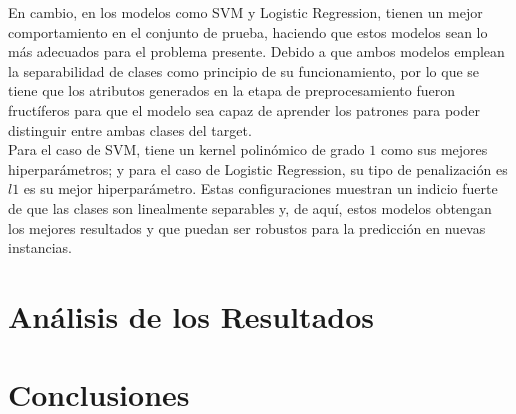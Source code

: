 \documentclass[12pt,a4paper]{article}
\begin{document}
{{            En cambio, en los modelos como SVM y Logistic Regression, tienen un mejor comportamiento 
            en el conjunto de prueba, haciendo que estos modelos sean lo más adecuados para el problema 
            presente. Debido a que ambos modelos emplean la separabilidad de clases como principio de 
            su funcionamiento, por lo que se tiene que los atributos generados en la etapa de preprocesamiento 
            fueron fructíferos para que el modelo sea capaz de aprender los patrones para poder distinguir 
            entre ambas clases del target.\\

            Para el caso de SVM, tiene un kernel polinómico de grado $1$ como sus mejores hiperparámetros; 
            y para el caso de Logistic Regression, su tipo de penalización es $l1$ es su mejor hiperparámetro. 
            Estas configuraciones muestran un indicio fuerte de que las clases son linealmente separables y, 
            de aquí, estos modelos obtengan los mejores resultados y que puedan ser robustos para la predicción 
            en nuevas instancias.
        }
    }
    \newpage

    \section{Análisis de los Resultados}
    {}
    \newpage

    \section{Conclusiones}
    {}
    \newpage

    \printbibliography[heading=bibintoc,title={Referencias Bibliográficas}]
\end{document}
